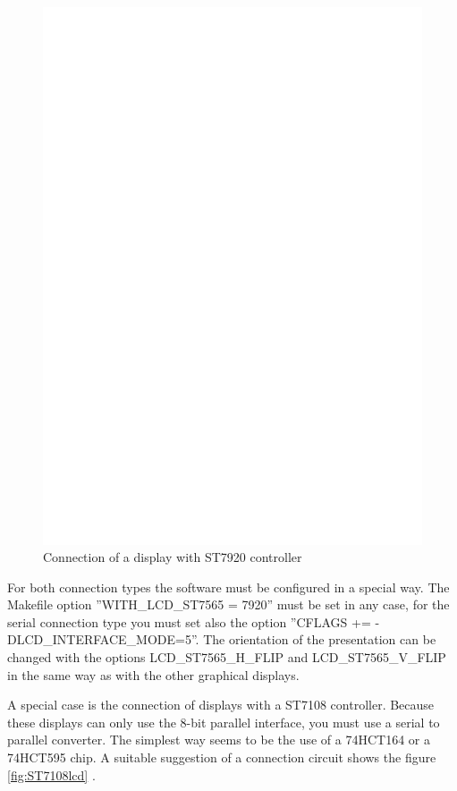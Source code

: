 \begin{figure}[H]
\centering
\includegraphics[width=14cm]{../FIG/ST7920interface.eps}
\caption{Connection of a display with ST7920 controller}
\label{fig:ST7920lcd}
\end{figure}

For both connection types the software must be configured in a special way.
The Makefile option ''WITH\_LCD\_ST7565 = 7920'' must be set in any case, for the serial
connection type you must set also the option ''CFLAGS += -DLCD\_INTERFACE\_MODE=5''.
The orientation of the presentation can be changed with the options LCD\_ST7565\_H\_FLIP and 
LCD\_ST7565\_V\_FLIP in the same way as with the other graphical displays.

A special case is the connection of displays with a ST7108 controller. Because these displays can only use 
the 8-bit parallel interface, you must use a serial to parallel converter.
The simplest way seems to be the use of a 74HCT164 or a 74HCT595 chip.
A suitable suggestion of a connection circuit shows the figure \ref{fig:ST7108lcd} .

